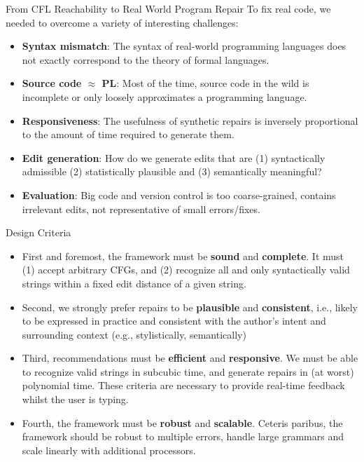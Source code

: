 \documentclass{beamer}
\begin{document}
\begin{frame}[fragile]{From CFL Reachability to Real World Program Repair}
  To fix real code, we needed to overcome a variety of interesting challenges:\vspace{10pt}

  \begin{itemize}
    \item \textbf{Syntax mismatch}: The syntax of real-world programming languages does not exactly correspond to the theory of formal languages.
    \item \textbf{Source code $\approx$ PL}: Most of the time, source code in the wild is incomplete or only loosely approximates a programming language.
    \item \textbf{Responsiveness}: The usefulness of synthetic repairs is inversely proportional to the amount of time required to generate them.
    \item \textbf{Edit generation}: How do we generate edits that are (1) syntactically admissible (2) statistically plausible and (3) semantically meaningful?
    \item \textbf{Evaluation}: Big code and version control is too coarse-grained, contains irrelevant edits, not representative of small errors/fixes.
  \end{itemize}
\end{frame}

\begin{frame}[fragile]{Design Criteria}
  \begin{itemize}
    \item First and foremost, the framework must be \textbf{sound} and \textbf{complete}. It must (1) accept arbitrary CFGs, and (2) recognize all and only syntactically valid strings within a fixed edit distance of a given string.
    \item Second, we strongly prefer repairs to be \textbf{plausible} and \textbf{consistent}, i.e., likely to be expressed in practice and consistent with the author's intent and surrounding context (e.g., stylistically, semantically)
    \item Third, recommendations must be \textbf{efficient} and \textbf{responsive}. We must be able to recognize valid strings in subcubic time, and generate repairs in (at worst) polynomial time. These criteria are necessary to provide real-time feedback whilst the user is typing.
    \item Fourth, the framework must be \textbf{robust} and \textbf{scalable}. Ceteris paribus, the framework should be robust to multiple errors, handle large grammars and scale linearly with additional processors.
  \end{itemize}
\end{frame}
\end{document}
